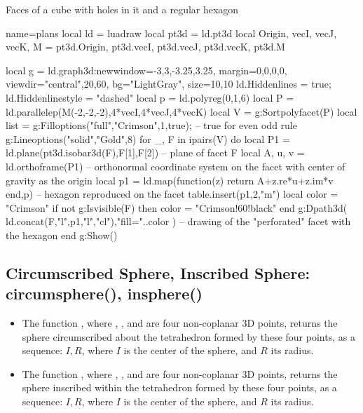 \begin{demo}{Faces of a cube with holes in it and a regular hexagon}
\begin{luadraw}{name=plans}
local ld = luadraw
local pt3d = ld.pt3d
local Origin, vecI, vecJ, vecK, M = pt3d.Origin, pt3d.vecI, pt3d.vecJ, pt3d.vecK, pt3d.M

local g = ld.graph3d:new{window={-3,3,-3.25,3.25}, margin={0,0,0,0},
    viewdir={"central",20,60}, bg="LightGray", size={10,10}}
ld.Hiddenlines = true; ld.Hiddenlinestyle = "dashed"
local p = ld.polyreg(0,1,6)
local P = ld.parallelep(M(-2,-2,-2),4*vecI,4*vecJ,4*vecK)
local V = g:Sortpolyfacet(P)
local list = {}
g:Filloptions("full","Crimson",1,true); -- true for even odd rule
g:Lineoptions("solid","Gold",8)
for _, F in ipairs(V) do
    local P1 = ld.plane(pt3d.isobar3d(F),F[1],F[2]) -- plane of facet F
    local A, u, v = ld.orthoframe(P1) -- orthonormal coordinate system on the facet with center of gravity as the origin
    local p1 = ld.map(function(z) return A+z.re*u+z.im*v end,p) -- hexagon reproduced on the facet
    table.insert(p1,2,"m")
    local color = "Crimson"
    if not g:Isvisible(F) then color = "Crimson!60!black" end
    g:Dpath3d( ld.concat(F,{"l"},p1,{"l","cl"}),"fill="..color ) -- drawing of the "perforated" facet with the hexagon
end
g:Show()
\end{luadraw}
\end{demo}

\subsection{Circumscribed Sphere, Inscribed Sphere: circumsphere(), insphere()}

\begin{itemize}
    \item The function , where , ,  and  are four non-coplanar 3D points, returns the sphere circumscribed about the tetrahedron formed by these four points, as a sequence: $I,R$, where $I$ is the center of the sphere, and $R$ its radius.

    \item The function , where , ,  and  are four non-coplanar 3D points, returns the sphere inscribed within the tetrahedron formed by these four points, as a sequence: $I,R$, where $I$ is the center of the sphere, and $R$ its radius.
\end{itemize}

